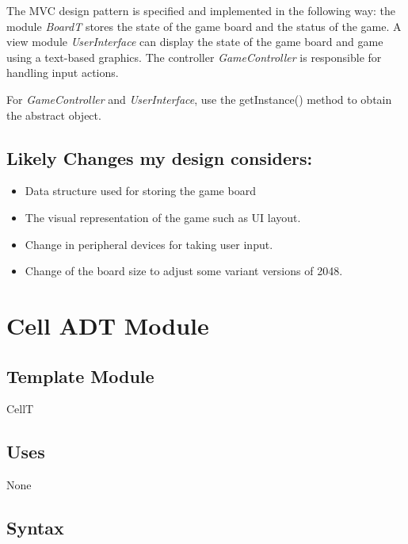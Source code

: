 \documentclass[12pt]{article}
\begin{document}

\noindent
The MVC design pattern is specified and implemented in the following way: the module \textit{BoardT}
stores the state of the game board and the status of the game. A view module \textit{UserInterface} can display
the state of the game board and game using a text-based graphics. The controller \textit{GameController}
is responsible for handling input actions. 

\bigskip

\noindent
For \textit{GameController} and \textit{UserInterface}, use the getInstance() method to obtain the abstract object.

\newpage

\subsection*{Likely Changes my design considers:}

\begin{itemize}
  \item Data structure used for storing the game board
  \item The visual representation of the game such as UI layout. 
  \item Change in peripheral devices for taking user input. 
  \item Change of the board size to adjust some variant versions of 2048.
\end{itemize}

\newpage

\section* {Cell ADT Module}

\subsection*{Template Module}

CellT

\subsection* {Uses}

None

\subsection* {Syntax}
\end{document}
